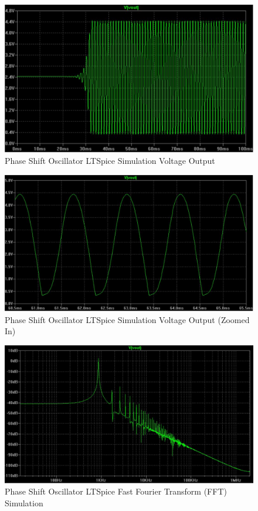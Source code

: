 \begin{figure}[H]
	\centering
	\includegraphics[width=0.8\linewidth]{psooutput.jpg}
	\caption{Phase Shift Oscillator LTSpice Simulation Voltage Output \cite{peterfarrell}}
	\label{psoltspicevoltageoutput}
\end{figure}

\begin{figure}[H]
	\centering
	\includegraphics[width=0.8\linewidth]{psooutputzoom.jpg}
	\caption{Phase Shift Oscillator LTSpice Simulation Voltage Output (Zoomed In) \cite{peterfarrell}}
	\label{psoltspicevoltageoutputzoom}
\end{figure}

\begin{figure}[H]
	\centering
	\includegraphics[width=0.8\linewidth]{psooutputfft.jpg}
	\caption{Phase Shift Oscillator LTSpice Fast Fourier Transform (FFT) Simulation \cite{peterfarrell}}
	\label{psoltspicefft}
\end{figure}

